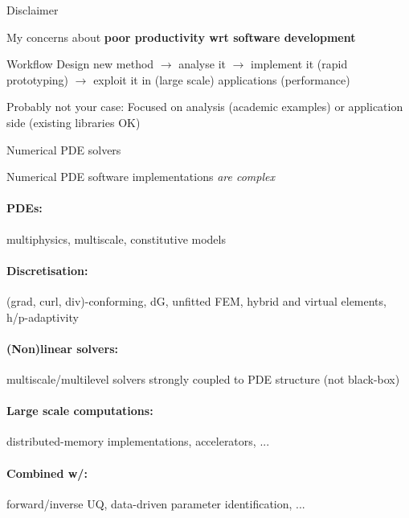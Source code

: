
\begin{frame}{Disclaimer}


My concerns about \textbf{poor productivity wrt software development}

\vspace{0.2cm}

\begin{block}{Workflow}
  Design new method $\rightarrow$ analyse it $\rightarrow$ implement it (rapid prototyping) $\rightarrow$ exploit it in (large scale) applications (performance)
\end{block}

\vspace{0.2cm}

Probably not your case: Focused on analysis (academic examples) or application side (existing libraries OK)

\end{frame}

% 

\begin{frame}{Numerical PDE solvers}

  Numerical PDE software implementations \emph{are complex}

\paragraph{\textbf{PDEs:}} multiphysics, multiscale, constitutive models

\paragraph{\textbf{Discretisation:}} (grad, curl, div)-conforming, dG, unfitted FEM, hybrid and virtual elements, h/p-adaptivity

\paragraph{\textbf{(Non)linear solvers:}} multiscale/multilevel solvers strongly coupled to PDE structure (not black-box)

\paragraph{\textbf{Large scale computations:}} distributed-memory implementations, accelerators, ...

\paragraph{\textbf{Combined w/:}} forward/inverse UQ, data-driven parameter identification, ...

\end{frame}

